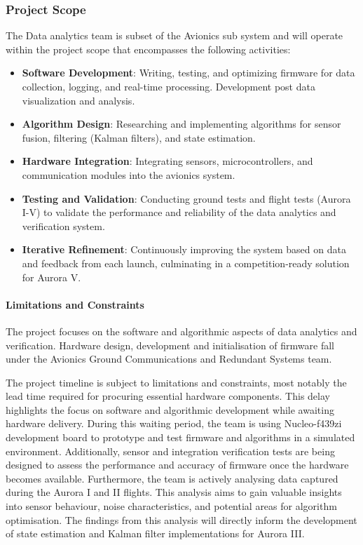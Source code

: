 \subsubsection{Project Scope}
The Data analytics team is subset of the Avionics sub system and will operate within the project scope that encompasses the following activities: 
\begin{itemize}
  \item \textbf{Software Development}: Writing, testing, and optimizing firmware for data collection, logging, and real-time processing. Development post data visualization and analysis. 
  \item \textbf{Algorithm Design}: Researching and implementing algorithms for sensor fusion, filtering (Kalman filters), and state estimation. 
  \item \textbf{Hardware Integration}: Integrating sensors, microcontrollers, and communication modules into the avionics system. 
  \item \textbf{Testing and Validation}: Conducting ground tests and flight tests (Aurora I-V) to validate the performance and reliability of the data analytics and verification system. 
  \item \textbf{Iterative Refinement}: Continuously improving the system based on data and feedback from each launch, culminating in a competition-ready solution for Aurora V.
\end{itemize}

\paragraph{Limitations and Constraints}
The project focuses on the software and algorithmic aspects of data analytics and verification. Hardware design, development and initialisation of firmware fall under the Avionics Ground Communications and Redundant Systems team. 

The project timeline is subject to limitations and constraints, most notably the lead time required for procuring essential hardware components. This delay highlights the focus on software and algorithmic development while awaiting hardware delivery. During this waiting period, the team is using Nucleo-f439zi development board to prototype and test firmware and algorithms in a simulated environment. Additionally, sensor and integration verification tests are being designed to assess the performance and accuracy of firmware once the hardware becomes available. Furthermore, the team is actively analysing data captured during the Aurora I and II flights. This analysis aims to gain valuable insights into sensor behaviour, noise characteristics, and potential areas for algorithm optimisation. The findings from this analysis will directly inform the development of state estimation and Kalman filter implementations for Aurora III. 

